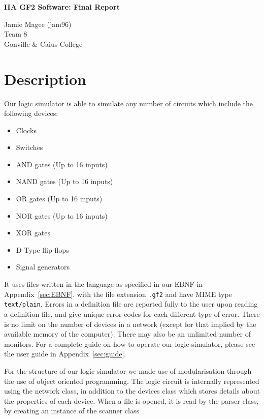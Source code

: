 \documentclass[a4paper,10pt]{article}
\begin{document}
\begin{center}
\Huge \textbf{IIA GF2 Software: Final Report}

\large Jamie Magee (jam96) \\ Team 8 \\ Gonville \& Caius College
\end{center}

\tableofcontents
\pagebreak

\section{Description}
Our logic simulator is able to simulate any number of circuits which include the following devices:

\begin{itemize}
\item Clocks
\item Switches
\item AND gates (Up to 16 inputs)
\item NAND gates (Up to 16 inputs)
\item OR gates (Up to 16 inputs)
\item NOR gates (Up to 16 inputs)
\item XOR gates
\item D-Type flip-flops
\item Signal generators
\end{itemize}

It uses files written in the language as specified in our EBNF in Appendix~\ref{sec:EBNF}, with the file extension \texttt{.gf2} and have MIME type \texttt{text/plain}. Errors in a definition file are reported fully to the user upon reading a definition file, and give unique error codes for each different type of error. There is no limit on the number of devices in a network (except for that implied by the available memory of the computer). There may also be an unlimited number of monitors. For a complete guide on how to operate our logic simulator, please see the user guide in Appendix~\ref{sec:guide}.

For the structure of our logic simulator we made use of modularisation through the use of object oriented programming. The logic circuit is internally represented using the network class, in addition to the devices class which stores details about the properties of each device. When a file is opened, it is read by the parser class, by creating an instance of the scanner class
\end{document}
